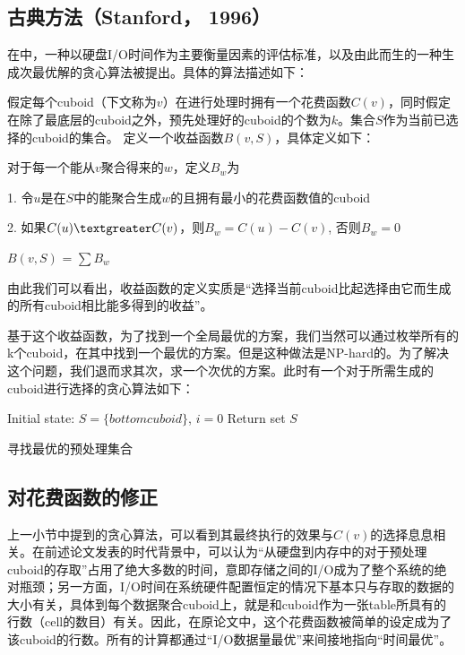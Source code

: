\subsection{古典方法（Stanford， 1996）}
在\cite{HarinarayanSIGMOD1996}中，一种以硬盘I/O时间作为主要衡量因素的评估标准，以及由此而生的一种生成次最优解的贪心算法被提出。具体的算法描述如下：

假定每个cuboid（下文称为$v$）在进行处理时拥有一个花费函数$C(v)$，同时假定在除了最底层的cuboid之外，预先处理好的cuboid的个数为$k$。集合$S$作为当前已选择的cuboid的集合。
定义一个收益函数$B(v, S)$，具体定义如下：

\begin{definition}
对于每一个能从$v$聚合得来的$w$，定义$B_w$为

{\quad}1. 令$u$是在$S$中的能聚合生成$w$的且拥有最小的花费函数值的cuboid

{\quad}2. 如果$C(u) \textgreater C(v)$，则$B_w = C(u) - C(v)$, 否则$B_w = 0$

$B(v, S)$ = $\sum B_w$
\end{definition}
由此我们可以看出，收益函数的定义实质是“选择当前cuboid比起选择由它而生成的所有cuboid相比能多得到的收益”。

基于这个收益函数，为了找到一个全局最优的方案，我们当然可以通过枚举所有的k个cuboid，在其中找到一个最优的方案。但是这种做法是NP-hard的。为了解决这个问题，我们退而求其次，求一个次优的方案。此时有一个对于所需生成的cuboid进行选择的贪心算法如下：
\begin{algorithm}[htbp]
\SetAlgoLined
{}
Initial state: $S = \{bottom cuboid\}$, $i = 0$\;
Return set $S$\;
\caption{寻找最优的预处理集合}
\label{algo:algorithm4}
\end{algorithm}

\subsection{对花费函数的修正}
上一小节中提到的贪心算法，可以看到其最终执行的效果与$C(v)$的选择息息相关。在前述论文发表的时代背景中，可以认为“从硬盘到内存中的对于预处理cuboid的存取”占用了绝大多数的时间，意即存储之间的I/O成为了整个系统的绝对瓶颈；另一方面，I/O时间在系统硬件配置恒定的情况下基本只与存取的数据的大小有关，具体到每个数据聚合cuboid上，就是和cuboid作为一张table所具有的行数（cell的数目）有关。因此，在原论文中，这个花费函数被简单的设定成为了该cuboid的行数。所有的计算都通过“I/O数据量最优”来间接地指向“时间最优”。

